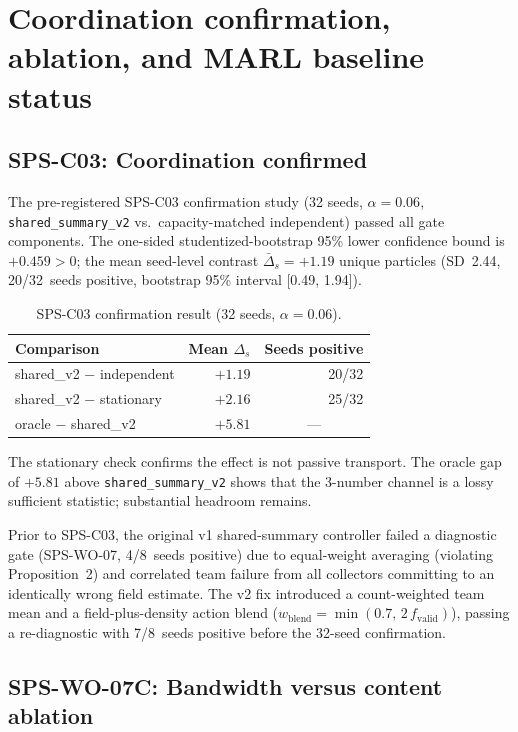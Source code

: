 \documentclass{article}
\begin{document}
\section{Coordination confirmation, ablation, and MARL baseline status}
\label{sec:c03_results}

\subsection*{SPS-C03: Coordination confirmed}

The pre-registered SPS-C03 confirmation study (32 seeds, $\alpha=0.06$,
\texttt{shared\_summary\_v2} vs.\ capacity-matched independent) passed all gate
components. The one-sided studentized-bootstrap 95\% lower confidence bound
is $+0.459>0$; the mean seed-level contrast $\bar\Delta_s=+1.19$ unique
particles (SD~2.44, 20/32~seeds positive, bootstrap 95\% interval [0.49, 1.94]).

\begin{table}[ht]
\centering
\caption{SPS-C03 confirmation result (32 seeds, $\alpha=0.06$).}
\label{tab:c03}
\begin{tabular}{lrr}
\toprule
Comparison & Mean $\Delta_s$ & Seeds positive \\
\midrule
shared\_v2 $-$ independent & $+1.19$ & 20/32 \\
shared\_v2 $-$ stationary  & $+2.16$ & 25/32 \\
oracle $-$ shared\_v2      & $+5.81$ & \multicolumn{1}{c}{---} \\
\bottomrule
\end{tabular}
\end{table}

The stationary check confirms the effect is not passive transport. The oracle
gap of $+5.81$ above \texttt{shared\_summary\_v2} shows that the 3-number
channel is a lossy sufficient statistic; substantial headroom remains.

Prior to SPS-C03, the original v1 shared-summary controller failed a
diagnostic gate (SPS-WO-07, 4/8~seeds positive) due to equal-weight averaging
(violating Proposition~2) and correlated team failure from all collectors
committing to an identically wrong field estimate. The v2 fix introduced a
count-weighted team mean and a field-plus-density action blend
($w_{\mathrm{blend}}=\min(0.7,\,2\,f_{\mathrm{valid}})$), passing a
re-diagnostic with 7/8~seeds positive before the 32-seed confirmation.

\subsection*{SPS-WO-07C: Bandwidth versus content ablation}
\end{document}
